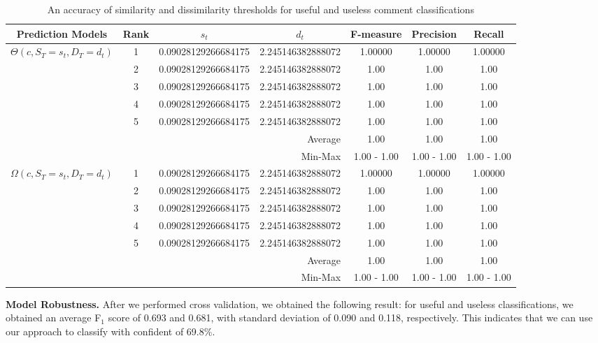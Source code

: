 \documentclass[conference]{IEEEtran}
\begin{document}
\begin{table}[!t]
\caption{An accuracy of similarity and dissimilarity thresholds for useful and useless comment classifications}
\small
\centering
\def\arraystretch{1.2}
\begin{tabular}{ccccccc}
\hline
Prediction Models  & Rank & $s_t$ & $d_t$ & F-measure & Precision & Recall \\ \hline \hline
\multirow{7}{*}{$\Theta(c,S_T=s_t,D_T=d_t)$} & 1 & 0.09028129266684175 & 2.245146382888072 &  1.00000 & 1.00000 & 1.00000 \\ \cline{2-7}
& 2 & 0.09028129266684175 & 2.245146382888072 &  1.00 & 1.00 & 1.00 \\ \cline{2-7}
& 3 & 0.09028129266684175 & 2.245146382888072 &  1.00 & 1.00& 1.00 \\ \cline{2-7}
& 4 & 0.09028129266684175 & 2.245146382888072 &  1.00 & 1.00 & 1.00 \\ \cline{2-7}
& 5 & 0.09028129266684175 & 2.245146382888072 &  1.00 & 1.00 & 1.00 \\ \cline{2-7}
& \multicolumn{3}{r}{Average} &  1.00 & 1.00 & 1.00 \\ \cline{2-7}
& \multicolumn{3}{r}{Min-Max} &   1.00 - 1.00 & 1.00 - 1.00  & 1.00 - 1.00  \\ \hline \hline
\multirow{7}{*}{$\Omega(c,S_T=s_t,D_T=d_t)$} & 1 & 0.09028129266684175 & 2.245146382888072 &  1.00000 & 1.00000 & 1.00000 \\ \cline{2-7}
& 2 & 0.09028129266684175 & 2.245146382888072 &  1.00 & 1.00 & 1.00 \\ \cline{2-7}
& 3 & 0.09028129266684175 & 2.245146382888072 &  1.00 & 1.00& 1.00 \\ \cline{2-7}
& 4 & 0.09028129266684175 & 2.245146382888072 &  1.00 & 1.00 & 1.00 \\ \cline{2-7}
& 5 & 0.09028129266684175 & 2.245146382888072 &  1.00 & 1.00 & 1.00 \\ \cline{2-7}
& \multicolumn{3}{r}{Average} &  1.00 & 1.00 & 1.00 \\ \cline{2-7}
& \multicolumn{3}{r}{Min-Max} &   1.00 - 1.00 & 1.00 - 1.00  & 1.00 - 1.00  \\ \hline
\end{tabular}
\label{tb:thresholds}
\end{table}

\textbf{Model Robustness.} After we performed cross validation, we obtained the following result:
for useful and useless classifications,
we obtained an average F$_1$ score of 0.693 and 0.681,
with standard deviation of 0.090 and 0.118, respectively.
This indicates that we can use our approach to classify with confident of 69.8\%.
\end{document}
